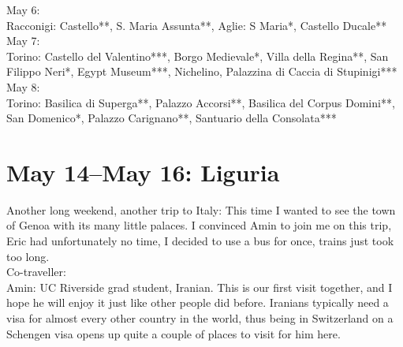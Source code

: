 May 6:\\
Racconigi: Castello**, S. Maria Assunta**, Aglie: S Maria*, Castello Ducale**\\

May 7:\\
Torino: Castello del Valentino***, Borgo Medievale*, Villa della Regina**, San Filippo Neri*, Egypt Museum***, Nichelino, Palazzina di Caccia di Stupinigi***\\

May 8:\\
Torino: Basilica di Superga**, Palazzo Accorsi**, Basilica del Corpus Domini**, San Domenico*, Palazzo Carignano**, Santuario della Consolata***

\section{May 14--May 16: Liguria}
\label{2016Liguria}

Another long weekend, another trip to Italy: This time I wanted to see the town of Genoa with its many little palaces. I convinced Amin to join me on this trip, Eric had unfortunately no time, I decided to use a bus for once, trains just took too long. \\

Co-traveller:\\
Amin: UC Riverside grad student, Iranian. This is our first visit together, and I hope he will enjoy it just like other people did before. Iranians typically need a visa for almost every other country in the world, thus being in Switzerland on a Schengen visa opens up quite a couple of places to visit for him here.\\

